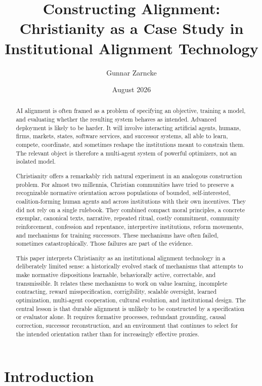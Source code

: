 \documentclass[11pt]{article}
\title{\textbf{Constructing Alignment: Christianity as a Case Study in Institutional Alignment Technology}}
\author{Gunnar Zarncke}
\date{August 2026}
\begin{document}
\maketitle

\begin{abstract}
AI alignment is often framed as a problem of specifying an objective, training a model, and evaluating whether the resulting system behaves as intended. Advanced deployment is likely to be harder. It will involve interacting artificial agents, humans, firms, markets, states, software services, and successor systems, all able to learn, compete, coordinate, and sometimes reshape the institutions meant to constrain them. The relevant object is therefore a multi-agent system of powerful optimizers, not an isolated model.

Christianity offers a remarkably rich natural experiment in an analogous construction problem. For almost two millennia, Christian communities have tried to preserve a recognizable normative orientation across populations of bounded, self-interested, coalition-forming human agents and across institutions with their own incentives. They did not rely on a single rulebook. They combined compact moral principles, a concrete exemplar, canonical texts, narrative, repeated ritual, costly commitment, community reinforcement, confession and repentance, interpretive institutions, reform movements, and mechanisms for training successors. These mechanisms have often failed, sometimes catastrophically. Those failures are part of the evidence.

This paper interprets Christianity as an institutional alignment technology in a deliberately limited sense: a historically evolved stack of mechanisms that attempts to make normative dispositions learnable, behaviorally active, correctable, and transmissible. It relates these mechanisms to work on value learning, incomplete contracting, reward misspecification, corrigibility, scalable oversight, learned optimization, multi-agent cooperation, cultural evolution, and institutional design. The central lesson is that durable alignment is unlikely to be constructed by a specification or evaluator alone. It requires formative processes, redundant grounding, causal correction, successor reconstruction, and an environment that continues to select for the intended orientation rather than for increasingly effective proxies.
\end{abstract}

\section{Introduction}
\end{document}
